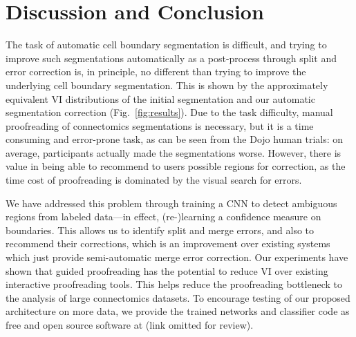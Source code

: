 \section{Discussion and Conclusion}

The task of automatic cell boundary segmentation is difficult, and trying to improve such segmentations automatically as a post-process through split and error correction is, in principle, no different than trying to improve the underlying cell boundary segmentation. This is shown by the approximately equivalent VI distributions of the initial segmentation and our automatic segmentation correction (Fig.~\ref{fig:results}). Due to the task difficulty, manual proofreading of connectomics segmentations is necessary, but it is a time consuming and error-prone task, as can be seen from the Dojo human trials: on average, participants actually made the segmentations worse. However, there is value in being able to recommend to users possible regions for correction, as the time cost of proofreading is dominated by the visual search for errors.

We have addressed this problem through training a CNN to detect ambiguous regions from labeled data---in effect, (re-)learning a confidence measure on boundaries. This allows us to identify split and merge errors, and also to recommend their corrections, which is an improvement over existing systems which just provide semi-automatic merge error correction. Our experiments have shown that guided proofreading has the potential to reduce VI over existing interactive proofreading tools. This helps reduce the proofreading bottleneck to the analysis of large connectomics datasets. To encourage testing of our proposed architecture on more data, we provide the trained networks and classifier code as free and open source software at (link omitted for review).





